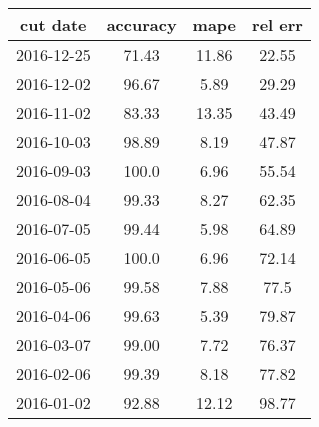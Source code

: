\begin{tabular}{cccc}
\toprule
\textbf{cut date} & \textbf{accuracy} & \textbf{mape} & \textbf{rel err} \\
\midrule
       2016-12-25 &             71.43 &         11.86 &            22.55 \\
       2016-12-02 &             96.67 &          5.89 &            29.29 \\
       2016-11-02 &             83.33 &         13.35 &            43.49 \\
       2016-10-03 &             98.89 &          8.19 &            47.87 \\
       2016-09-03 &             100.0 &          6.96 &            55.54 \\
       2016-08-04 &             99.33 &          8.27 &            62.35 \\
       2016-07-05 &             99.44 &          5.98 &            64.89 \\
       2016-06-05 &             100.0 &          6.96 &            72.14 \\
       2016-05-06 &             99.58 &          7.88 &             77.5 \\
       2016-04-06 &             99.63 &          5.39 &            79.87 \\
       2016-03-07 &             99.00 &          7.72 &            76.37 \\
       2016-02-06 &             99.39 &          8.18 &            77.82 \\
       2016-01-02 &             92.88 &         12.12 &            98.77 \\
\bottomrule
\end{tabular}
